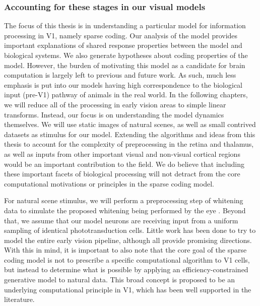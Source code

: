 \subsubsection{Accounting for these stages in our visual models}
The focus of this thesis is in understanding a particular model for information processing in V1, namely sparse coding. Our analysis of the model provides important explanations of shared response properties between the model and biological systems. We also generate hypotheses about coding properties of the model. However, the burden of motivating this model as a candidate for brain computation is largely left to previous and future work. As such, much less emphasis is put into our models having high correspondence to the biological input (pre-V1) pathway of animals in the real world. In the following chapters, we will reduce all of the processing in early vision areas to simple linear transforms. Instead, our focus is on understanding the model dynamics themselves. We will use static images of natural scenes, as well as small contrived datasets as stimulus for our model. Extending the algorithms and ideas from this thesis to account for the complexity of preprocessing in the retina and thalamus, as well as inputs from other important visual and non-visual cortical regions would be an important contribution to the field. We do believe that including these important facets of biological processing will not detract from the core computational motivations or principles in the sparse coding model.

For natural scene stimulus, we will perform a preprocessing step of whitening data  \citeyearpar{olshausen1997sparse} to simulate the proposed whitening being performed by the eye \parencite{atick1992what, rucci2015unsteady}.
Beyond that, we assume that our model neurons are receiving input from a uniform sampling of identical phototransduction cells.
Little work has been done to try to model the entire early vision pipeline, although \parencite{shan2013efficient, doi2007theory, lindsey2019unified} all provide promising directions.
With this in mind, it is important to also note that the core goal of the sparse coding model is not to prescribe a specific computational algorithm to V1 cells, but instead to determine what is possible by applying an efficiency-constrained generative model to natural data.
This broad concept is proposed to be an underlying computational principle in V1, which has been well supported in the literature.


